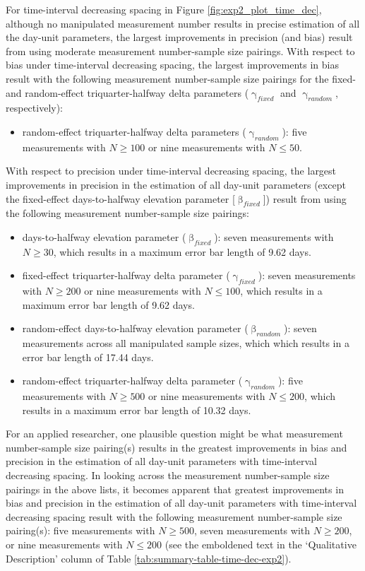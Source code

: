 \documentclass[
12pt, %
twoside,
english]{guelphthesis}
\theoremstyle{definition}
\theoremstyle{definition}
\theoremstyle{definition}
\theoremstyle{definition}
\theoremstyle{remark}
\begin{document}
For time-interval decreasing spacing in Figure \ref{fig:exp2_plot_time_dec}, although no manipulated measurement number results in precise estimation of all the day-unit parameters, the largest improvements in precision (and bias) result from using moderate measurement number-sample size pairings. With respect to bias under time-interval decreasing spacing, the largest improvements in bias result with the following measurement number-sample size pairings for the fixed- and random-effect triquarter-halfway delta parameters (\(\upgamma_{fixed}\) and \(\upgamma_{random}\), respectively):
\begin{itemize}
\tightlist
\item
  random-effect triquarter-halfway delta parameters (\(\upgamma_{random}\)): five measurements with \(N \ge 100\) or nine measurements with \(N \le 50\).
\end{itemize}
\noindent With respect to precision under time-interval decreasing spacing, the largest improvements in precision in the estimation of all day-unit parameters (except the fixed-effect days-to-halfway elevation parameter {[}\(\upbeta_{fixed}\){]}) result from using the following measurement number-sample size pairings:
\begin{itemize}
\tightlist
\item
  days-to-halfway elevation parameter (\(\upbeta_{fixed}\)): seven measurements with \(N \ge 30\), which results in a maximum error bar length of 9.62 days.
\item
  fixed-effect triquarter-halfway delta parameter (\(\upgamma_{fixed}\)): seven measurements with \(N \ge 200\) or nine measurements with \(N \le 100\), which results in a maximum error bar length of 9.62 days.
\item
  random-effect days-to-halfway elevation parameter (\(\upbeta_{random}\)): seven measurements across all manipulated sample sizes, which which results in a error bar length of 17.44 days.
\item
  random-effect triquarter-halfway delta parameter (\(\upgamma_{random}\)): five measurements with \(N \ge 500\) or nine measurements with \(N \le 200\), which results in a maximum error bar length of 10.32 days.
\end{itemize}
For an applied researcher, one plausible question might be what measurement number-sample size pairing(s) results in the greatest improvements in bias and precision in the estimation of all day-unit parameters with time-interval decreasing spacing. In looking across the measurement number-sample size pairings in the above lists, it becomes apparent that greatest improvements in bias and precision in the estimation of all day-unit parameters with time-interval decreasing spacing result with the following measurement number-sample size pairing(s): five measurements with \(N \ge 500\), seven measurements with \(N \ge 200\), or nine measurements with \(N \le 200\) (see the emboldened text in the `Qualitative Description' column of Table \ref{tab:summary-table-time-dec-exp2}).
\end{document}
